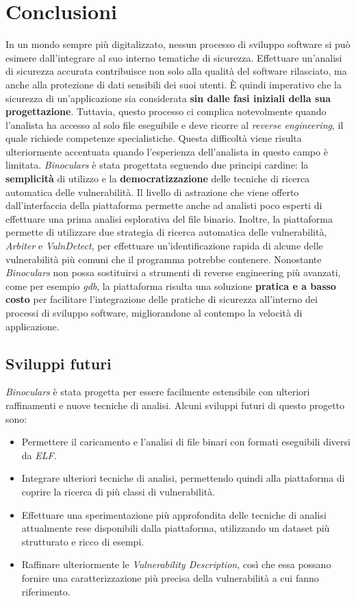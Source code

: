 \documentclass[../main.tex]{subfiles}
\begin{document}
\chapter{Conclusioni}
In un mondo sempre più digitalizzato, nessun processo di sviluppo software si può esimere dall'integrare al suo interno tematiche di sicurezza.
Effettuare un'analisi di sicurezza accurata contribuisce non solo alla qualità del software rilasciato, ma anche alla protezione di
dati sensibili dei suoi utenti. È quindi imperativo che la sicurezza di un'applicazione sia considerata \textbf{sin dalle fasi iniziali della sua progettazione}.
Tuttavia, questo processo ci complica notevolmente quando l'analista ha accesso al solo file eseguibile e deve ricorre al \textit{reverse engineering}, il quale richiede
competenze specialistiche. Questa difficoltà viene risulta ulteriormente accentuata quando l'esperienza dell'analista in questo campo è limitata.
\textit{Binoculars} è stata progettata seguendo due principi cardine: la \textbf{semplicità} di utilizzo e la \textbf{democratizzazione} delle tecniche di ricerca automatica delle vulnerabilità. 
Il livello di astrazione che viene offerto dall'interfaccia della piattaforma permette anche ad analisti poco esperti di effettuare una prima analisi esplorativa del file binario.
Inoltre, la piattaforma permette di utilizzare due strategia di ricerca automatica delle vulnerabilità, \textit{Arbiter} e \textit{VulnDetect}, per effettuare un'identificazione
rapida di alcune delle vulnerabilità più comuni che il programma potrebbe contenere. Nonostante \textit{Binoculars} non possa sostituirsi a strumenti di reverse engineering più avanzati, come per esempio
\textit{gdb}, la piattaforma risulta una soluzione \textbf{pratica e a basso costo} per facilitare l'integrazione delle pratiche di sicurezza all'interno dei processi di sviluppo software, migliorandone al contempo
la velocità di applicazione.
\section{Sviluppi futuri}
\textit{Binoculars} è stata progetta per essere facilmente estensibile con ulteriori raffinamenti e nuove tecniche di analisi. Alcuni sviluppi futuri di questo progetto sono:
\begin{itemize}
    \item Permettere il caricamento e l'analisi di file binari con formati eseguibili diversi da \textit{ELF}.
    \item Integrare ulteriori tecniche di analisi, permettendo quindi alla piattaforma di coprire la ricerca di più classi di vulnerabilità.
    \item Effettuare una sperimentazione più approfondita delle tecniche di analisi attualmente rese disponibili dalla piattaforma, utilizzando un dataset più strutturato e ricco di esempi.
    \item Raffinare ulteriormente le \textit{Vulnerability Description}, così che essa possano fornire una caratterizzazione più precisa della vulnerabilità a cui fanno riferimento.
\end{itemize}
\end{document}
